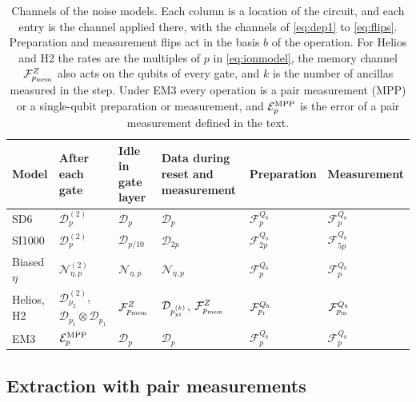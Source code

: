\begin{table}[t]
  \caption{Channels of the noise models. Each column is a location of the circuit, and each entry is the channel applied there, with the channels of \autoref{eq:dep1} to \autoref{eq:flips}. Preparation and measurement flips act in the basis $b$ of the operation. For Helios and H2 the rates are the multiples of $p$ in \autoref{eq:ionmodel}, the memory channel $\mathcal{F}^{Z}_{p_{\rm mem}}$ also acts on the qubits of every gate, and $k$ is the number of ancillas measured in the step. Under EM3 every operation is a pair measurement (MPP) or a single-qubit preparation or measurement, and $\mathcal{E}^{\rm MPP}_p$ is the error of a pair measurement defined in the text.}
  \label{tab:noise}
  \begin{ruledtabular}
  \begin{tabular}{llllll}
    Model & After each gate & Idle in gate layer & Data during reset and measurement & Preparation & Measurement \\
    \hline
    SD6 & $\mathcal{D}^{(2)}_{p}$ & $\mathcal{D}_{p}$ & $\mathcal{D}_{p}$ & $\mathcal{F}^{Q_b}_{p}$ & $\mathcal{F}^{Q_b}_{p}$ \\
    SI1000 & $\mathcal{D}^{(2)}_{p}$ & $\mathcal{D}_{p/10}$ & $\mathcal{D}_{2p}$ & $\mathcal{F}^{Q_b}_{2p}$ & $\mathcal{F}^{Q_b}_{5p}$ \\
    Biased $\eta$ & $\mathcal{N}^{(2)}_{\eta,p}$ & $\mathcal{N}_{\eta,p}$ & $\mathcal{N}_{\eta,p}$ & $\mathcal{F}^{Q_b}_{p}$ & $\mathcal{F}^{Q_b}_{p}$ \\
    Helios, H2 & $\mathcal{D}^{(2)}_{p_2}$, $\mathcal{D}_{p_1}\otimes\mathcal{D}_{p_1}$ & $\mathcal{F}^{Z}_{p_{\rm mem}}$ & $\mathcal{D}_{p^{(k)}_{\rm xt}}$, $\mathcal{F}^{Z}_{p_{\rm mem}}$ & $\mathcal{F}^{Q_b}_{p_{\rm r}}$ & $\mathcal{F}^{Q_b}_{p_{\rm m}}$ \\
    EM3 & $\mathcal{E}^{\rm MPP}_{p}$ & $\mathcal{D}_{p}$ & $\mathcal{D}_{p}$ & $\mathcal{F}^{Q_b}_{p}$ & $\mathcal{F}^{Q_b}_{p}$ \\
  \end{tabular}
  \end{ruledtabular}
\end{table}

\subsection{Extraction with pair measurements}
\label{sec:em3}

